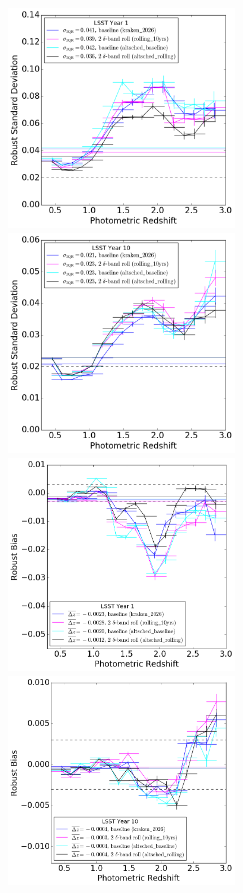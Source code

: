 \begin{figure}
\begin{center}
\includegraphics[width=6cm,trim={0cm 0cm 0cm 0cm},clip]{figures/ALTyear1_IQRs.png}
\includegraphics[width=6cm,trim={0cm 0cm 0cm 0cm},clip]{figures/ALTyear10_IQRs.png}
\includegraphics[width=6cm,trim={0cm 0cm 0cm 0cm},clip]{figures/ALTyear1_bias.png}
\includegraphics[width=6cm,trim={0cm 0cm 0cm 0cm},clip]{figures/ALTyear10_bias.png}

\end{center}
\end{figure}
